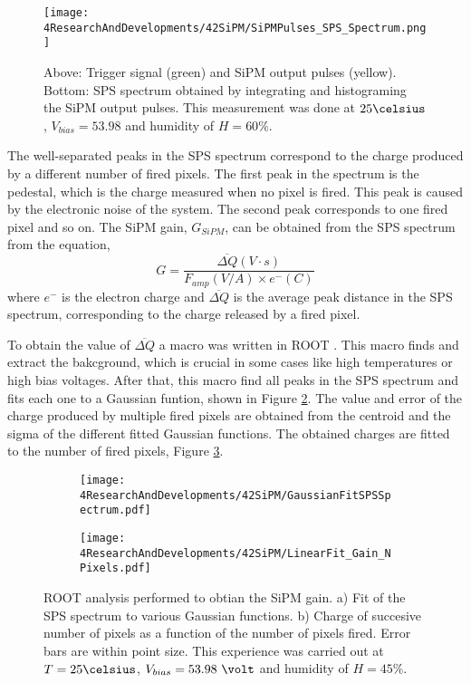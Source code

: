 \begin{figure}[hbtp]
\centering
\texttt{[image: 4ResearchAndDevelopments/42SiPM/SiPMPulses\_SPS\_Spectrum.png]}
\caption{Above: Trigger signal (green) and SiPM output pulses (yellow). Bottom: SPS spectrum obtained by integrating and histograming the SiPM output pulses. This measurement was done at $25\celsius$, $V_{bias}=53.98$ and humidity of $H=60\%$. \label{fig:OutputPulses_SPSspectrum}}
\end{figure}

The well-separated peaks in the SPS spectrum correspond to the charge produced by a different number of fired pixels. The first peak in the spectrum is the pedestal, which is the charge measured when no pixel is fired. This peak is caused by the electronic noise of the system. The second peak corresponds to one fired pixel and so on. The SiPM gain, $G_{SiPM}$, can be obtained from the SPS spectrum from the equation,
\begin{equation}
G=\frac{\overline{\Delta Q}(V \cdot{} s)}{F_{amp}(V/A) \times e^-(C)}
\label{SiPMGain}
\end{equation}
where $e^-$ is the electron charge and $\overline{\Delta Q}$ is the average peak distance in the SPS spectrum, corresponding to the charge released by a fired pixel. 

To obtain the value of $\overline{\Delta Q}$ a macro was written in ROOT \cite{ROOTWebPage}. This macro finds and extract the bakcground, which is crucial in some cases like high temperatures or high bias voltages. After that, this macro find all peaks in the SPS spectrum and fits each one to a Gaussian funtion, shown in Figure \ref{subfig:GaussianFitSiPMs}. The value and error of the charge produced by multiple fired pixels are obtained from the centroid and the sigma of the different fitted Gaussian functions. The obtained charges are fitted to the number of fired pixels, Figure \ref{subfig:LinearFitSiPMGain}.

\begin{figure}
\centering
    \begin{subfigure}[b]{0.47\textwidth}
    \centering
    \texttt{[image: 4ResearchAndDevelopments/42SiPM/GaussianFitSPSSpectrum.pdf]}  
    \caption{\label{subfig:GaussianFitSiPMs}}
    \end{subfigure}
    \hfill
    \begin{subfigure}[b]{0.47\textwidth}
    \centering
    \texttt{[image: 4ResearchAndDevelopments/42SiPM/LinearFit\_Gain\_NPixels.pdf]}  
    \caption{\label{subfig:LinearFitSiPMGain}}
    \end{subfigure}
 \caption{ROOT analysis performed to obtian the SiPM gain. a) Fit of the SPS spectrum to various Gaussian functions. b) Charge of succesive number of pixels as a function of the number of pixels fired. Error bars are within point size. This experience was carried out at $T=25\celsius$, $V_{bias}=53.98~\volt$ and humidity of $H=45\%$.}
 \label{fig:ROOTAnalysisSiPMGain}
\end{figure}


